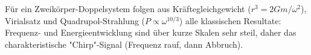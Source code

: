 \begin{merksatz}
Für ein Zweikörper-Doppelsystem folgen aus Kräftegleichgewicht ($r^3=2Gm/\omega^2$),
Virialsatz und Quadrupol-Strahlung ($P\propto\omega^{10/3}$) alle klassischen
Resultate: Frequenz- und Energieentwicklung sind über kurze Skalen sehr steil,
daher das charakteristische "Chirp"-Signal (Frequenz rauf, dann Abbruch).
\end{merksatz}